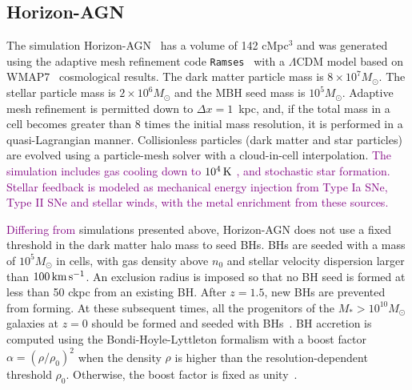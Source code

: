 \documentclass[twocolumn]{aastex631}
\newcommand{\red}[1]{\textcolor{purple}{#1}}
\def\smass{{$M_*$}}
\begin{document}
\subsection{Horizon-AGN}\label{subsec:Horizon}
The simulation Horizon-AGN~\citep{2014MNRAS.444.1453D, 2016MNRAS.463.3948D} has a volume of 142 cMpc$^3$ and was generated using the adaptive mesh refinement code {\tt Ramses}~\citep{2002A&A...385..337T} with a $\Lambda$CDM model based on WMAP7~\citep{2011ApJS..192...18K} cosmological results. The dark matter particle mass is $8\times 10^7 M_{\odot}$. The stellar particle mass is $2\times 10^6 M_{\odot}$ and the MBH seed mass is $10^5 M_{\odot}$. Adaptive mesh refinement is permitted down to $\Delta x=1$~kpc, and, if the total mass in a cell becomes greater than 8 times the initial mass resolution, it is performed in a quasi-Lagrangian manner. Collisionless particles (dark matter and star particles) are evolved using a particle-mesh solver with a cloud-in-cell interpolation.
\red{The simulation includes gas cooling down to $10^4\, \rm K$ \citep{sutherland&dopita93}, and stochastic star formation. Stellar feedback is modeled as mechanical energy injection from Type Ia SNe, Type II SNe and stellar winds, with the metal enrichment from these sources.}

\red{Differing from} simulations presented above, Horizon-AGN does not use a fixed threshold in the dark matter halo mass to seed BHs.  BHs are seeded with a mass of $10^5 M_\odot$ in cells, with gas density above $n_0$ and stellar velocity dispersion larger than $100 \,\rm km\,s^{-1}$. An exclusion radius is imposed so that no BH seed is formed at less than 50 ckpc from an existing BH. After $z = 1.5$, new BHs are prevented from forming. At these subsequent times, all the progenitors of the \smass$>10^{10} M_{\odot}$ galaxies at $z = 0$ should be formed and seeded with BHs~\citep{2016MNRAS.460.2979V}.  BH accretion is computed using the Bondi-Hoyle-Lyttleton formalism with a boost factor $\alpha = (\rho/\rho_0)^2$ when the density $\rho$ is higher than the resolution-dependent threshold $\rho_0$. Otherwise, the boost factor is fixed as unity~\citep{2009MNRAS.398...53B}.
\end{document}
